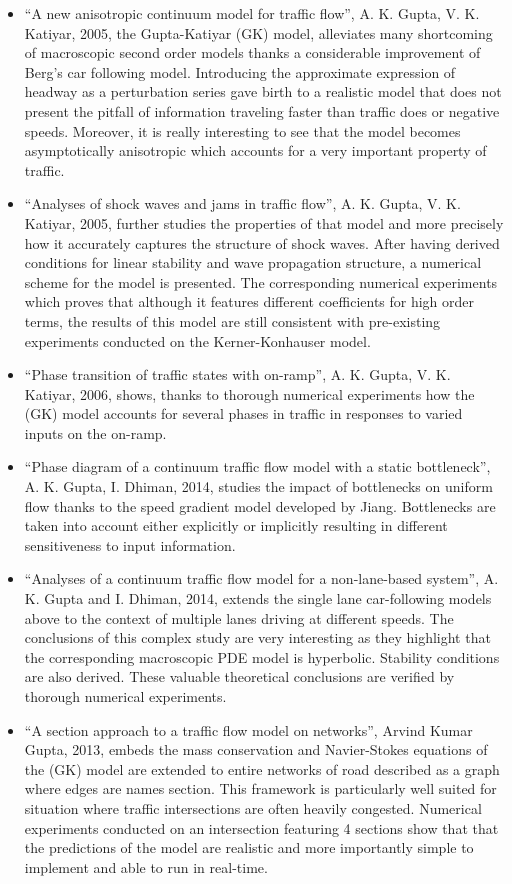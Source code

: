\documentclass{article}
\begin{document}
\begin{itemize}
\item ``A new anisotropic continuum model for traffic flow'', A. K. Gupta, V. K. Katiyar, 2005, the Gupta-Katiyar (GK) model, alleviates many shortcoming of macroscopic second order models thanks a considerable improvement of Berg's car following model. Introducing the approximate expression of headway as a perturbation series gave birth to a realistic model that does not present the pitfall of information traveling faster than traffic does or negative speeds. Moreover, it is really interesting to see that the model becomes asymptotically anisotropic which accounts for a very important property of traffic.
\item ``Analyses of shock waves and jams in traffic flow'', A. K. Gupta, V. K. Katiyar, 2005, further studies the properties of that model and more precisely how it accurately captures the structure of shock waves. After having derived conditions for linear stability and wave propagation structure, a numerical scheme for the model is presented. The corresponding numerical experiments which proves that although it features different coefficients for high order terms, the results of this model are still consistent with pre-existing experiments conducted on the Kerner-Konhauser model.
\item ``Phase transition of traffic states with on-ramp'', A. K. Gupta, V. K. Katiyar, 2006, shows, thanks to thorough numerical experiments how the (GK) model accounts for several phases in traffic in responses to varied inputs on the on-ramp.
\item ``Phase diagram of a continuum traffic flow model with a static bottleneck'', A. K. Gupta, I. Dhiman, 2014, studies the impact of bottlenecks on uniform flow thanks to the speed gradient model developed by Jiang. Bottlenecks are taken into account either explicitly or implicitly resulting in different sensitiveness to input information.
\item ``Analyses of a continuum traffic flow model for a non-lane-based system'', A. K. Gupta and I. Dhiman, 2014, extends the single lane car-following models above to the context of multiple lanes driving at different speeds. The conclusions of this complex study are very interesting as they highlight that the corresponding macroscopic PDE model is hyperbolic. Stability conditions are also derived. These valuable theoretical conclusions are verified by thorough numerical experiments.
\item ``A section approach to a traffic flow model on networks'', Arvind Kumar Gupta, 2013, embeds the mass conservation and Navier-Stokes equations of the (GK) model are extended to entire networks of road described as a graph where edges are names section. This framework is particularly well suited for situation where traffic intersections are often heavily congested. Numerical experiments conducted on an intersection featuring 4 sections show that that the predictions of the model are realistic and more importantly simple to implement and able to run in real-time.
\end{itemize}
\end{document}
